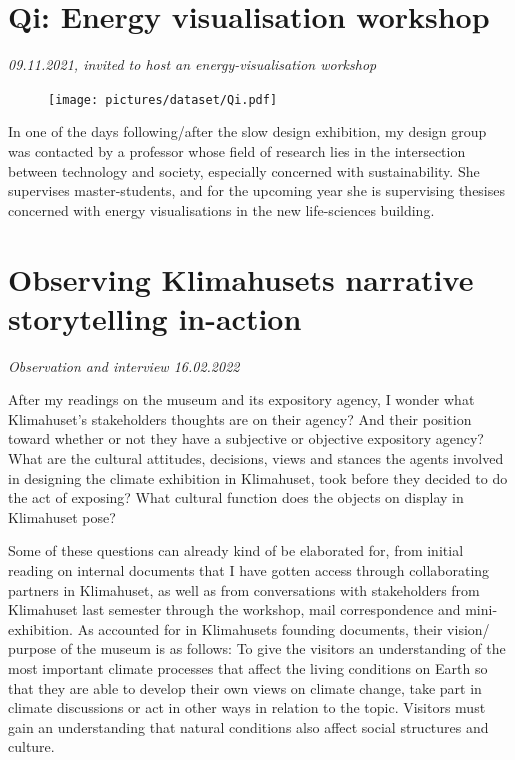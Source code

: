 \section{Qi: Energy visualisation workshop}
\emph{09.11.2021, invited to host an energy-visualisation workshop}
\begin{figure}[H]
\texttt{[image: pictures/dataset/Qi.pdf]}
\centering 
\end{figure}

In one of the days following/after the slow design exhibition, my design group was contacted by a professor whose field of research lies in the intersection between technology and society, especially concerned with sustainability. She supervises master-students, and for the upcoming year she is supervising thesises concerned with energy visualisations in the new life-sciences building.  



\section{Observing Klimahusets narrative storytelling in-action}
\par
\emph{Observation and interview 16.02.2022}
\par

After my readings on the museum and its expository agency, I wonder what Klimahuset’s stakeholders thoughts are on their agency? And their position toward whether or not they have a subjective or objective expository agency? What are the cultural attitudes, decisions, views and stances the agents involved in designing the climate exhibition in Klimahuset, took before they decided to do the act of exposing? What cultural function does the objects on display in Klimahuset pose? 

Some of these questions can already kind of be elaborated for, from initial reading on internal documents that I have gotten access through collaborating partners in Klimahuset, as well as from conversations with stakeholders from Klimahuset last semester through the workshop, mail correspondence and mini-exhibition. As accounted for in Klimahusets founding documents, their vision/ purpose of the museum is as follows:
To give the visitors an understanding of the most important climate processes that affect the living conditions on Earth so that they are able to develop their own views on climate change, take part in climate discussions or act in other ways in relation to the topic.
Visitors must gain an understanding that natural conditions also affect social structures and culture.
	
